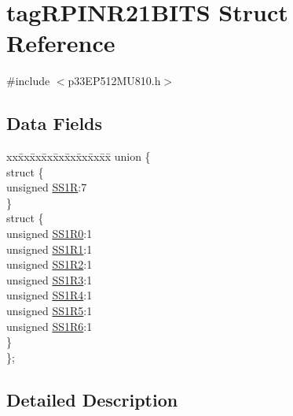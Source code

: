 \hypertarget{structtag_r_p_i_n_r21_b_i_t_s}{}\section{tag\+R\+P\+I\+N\+R21\+B\+I\+TS Struct Reference}
\label{structtag_r_p_i_n_r21_b_i_t_s}


{\ttfamily \#include $<$p33\+E\+P512\+M\+U810.\+h$>$}

\subsection*{Data Fields}
\begin{DoxyCompactItemize}
\item 
\begin{tabbing}
xx\=xx\=xx\=xx\=xx\=xx\=xx\=xx\=xx\=\kill
union \{\\
\>struct \{\\
\>\>unsigned \hyperlink{structtag_r_p_i_n_r21_b_i_t_s_a7a1844365e87346b185855efb4f2cbf3}{SS1R}:7\\
\>\} \\
\>struct \{\\
\>\>unsigned \hyperlink{structtag_r_p_i_n_r21_b_i_t_s_a81d631d508b4a225ce466d2163f4a4eb}{SS1R0}:1\\
\>\>unsigned \hyperlink{structtag_r_p_i_n_r21_b_i_t_s_a00a382582052d3678b140138f05186fe}{SS1R1}:1\\
\>\>unsigned \hyperlink{structtag_r_p_i_n_r21_b_i_t_s_a6347b803248906142a2ca8c34a507c0c}{SS1R2}:1\\
\>\>unsigned \hyperlink{structtag_r_p_i_n_r21_b_i_t_s_af900253e562cc9b141a94eda838b3c4b}{SS1R3}:1\\
\>\>unsigned \hyperlink{structtag_r_p_i_n_r21_b_i_t_s_a3acf676116e2457f44a5675a5b7656e9}{SS1R4}:1\\
\>\>unsigned \hyperlink{structtag_r_p_i_n_r21_b_i_t_s_a0ebd3b8fed5f6ba83e1c1a06c1fe2277}{SS1R5}:1\\
\>\>unsigned \hyperlink{structtag_r_p_i_n_r21_b_i_t_s_afe38c0d1f022f5013407f013eb9c644f}{SS1R6}:1\\
\>\} \\
\}; \\

\end{tabbing}\end{DoxyCompactItemize}


\subsection{Detailed Description}


